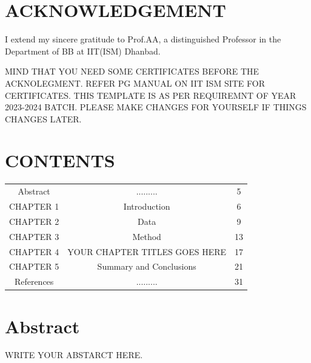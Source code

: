 \documentclass[12pt]{article}
\begin{document}

\newpage
\clearpage 
\setcounter{page}{1}  %


\section*{ACKNOWLEDGEMENT}
I extend my sincere gratitude to Prof.AA, a distinguished Professor in the Department of BB at IIT(ISM) Dhanbad. 

MIND THAT YOU NEED SOME CERTIFICATES BEFORE THE ACKNOLEGMENT. REFER PG MANUAL ON IIT ISM SITE FOR CERTIFICATES. 
THIS TEMPLATE IS AS PER REQUIREMNT OF YEAR 2023-2024 BATCH. PLEASE MAKE CHANGES FOR YOURSELF IF THINGS CHANGES LATER.


\newpage
\section*{CONTENTS}
\begin{tabular}{ccc}

 Abstract  &  .........                  &  5 \\
CHAPTER 1  & Introduction                &  6 \\
CHAPTER 2  &  Data                       &  9 \\
CHAPTER 3  & Method                      &  13 \\
CHAPTER 4  & YOUR CHAPTER TITLES GOES HERE   &  17 \\
CHAPTER 5  &  Summary and Conclusions    &  21 \\
References & .........                   & 31

\end{tabular}

\newpage
\section*{}
\listoftables


\section*{}
\listoffigures

\newpage
\section*{Abstract}
WRITE YOUR ABSTARCT HERE.
\end{document}
